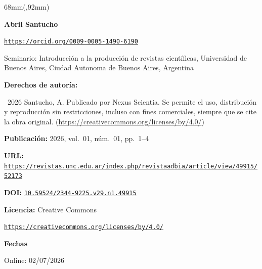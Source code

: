 \documentclass{article}
\newlength{\gbbloquex}
\begin{document}
\begin{textblock*}{68mm}(\gbbloquex,92mm)
{\setlength{\leftskip}{0pt}\setlength{\parindent}{0pt}%
\noindent\begin{minipage}[t]{68mm}
\sffamily\small\setlength{\parskip}{1pt}
{\bfseries\color{azulrevista}Abril Santucho}\par
{\scriptsize\texttt{\href{https://orcid.org/0009-0005-1490-6190}{https://orcid.org/0009-0005-1490-6190}}}\par
Seminario: Introducción a la producción de revistas científicas, Universidad de Buenos Aires, Ciudad Autonoma de Buenos Aires, Argentina\par
\vspace{6pt}
{\bfseries\color{azulrevista!70}Derechos de autor\'ia:}\par
\textcopyright\ 2026 Santucho, A. Publicado por Nexus Scientia. Se permite el uso, distribución y reproducción sin restricciones, incluso con fines comerciales, siempre que se cite la obra original. (\href{https://creativecommons.org/licenses/by/4.0/}{https://creativecommons.org/licenses/by/4.0/})\par\vspace{6pt}
{\bfseries\color{azulrevista!70}Publicación:} 2026, vol.~01, n\'um.~01, pp.~1--4\par\vspace{6pt}
{\bfseries\color{azulrevista!70}URL:} {\scriptsize\texttt{\href{https://revistas.unc.edu.ar/index.php/revistaadbia/article/view/49915/52173}{https://revistas.unc.edu.ar/index.php/revistaadbia/article/view/49915/52173}}}\par\vspace{6pt}
{\bfseries\color{azulrevista!70}DOI:} {\scriptsize\texttt{\href{https://doi.org/10.59524/2344-9225.v29.n1.49915}{10.59524/2344-9225.v29.n1.49915}}}\par\vspace{6pt}
{\bfseries\color{azulrevista!70}Licencia:} Creative Commons\par
{\scriptsize\texttt{\href{https://creativecommons.org/licenses/by/4.0/}{https://creativecommons.org/licenses/by/4.0/}}}\par
\vspace{6pt}
{\bfseries\color{azulrevista!70}Fechas}\par\vspace{2pt}
Online: 02/07/2026\par
\vspace{6pt}
\vspace{6pt}

\end{minipage}}
\end{textblock*}
\end{document}
